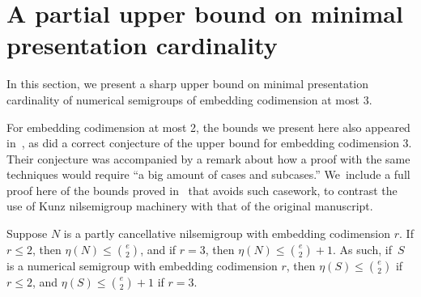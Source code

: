 \documentclass[ALCO]{cedram}
\begin{document}
\section{A partial upper bound on minimal presentation cardinality}
\label{sec:upperbound}



In this section, we present a sharp upper bound on minimal presentation cardinality of numerical semigroups of embedding codimension at most $3$.  

\begin{rema}\label{r:upperboundcite}
For embedding codimension at most 2, the bounds we present here also appeared in~\cite{highembdim}, as did a correct conjecture of the upper bound for embedding codimension 3.  Their conjecture was accompanied by a remark about how a proof with the same techniques would require ``a big amount of cases and subcases.''  
We~include a full proof here of the bounds proved in~\cite{highembdim} that avoids such casework, to contrast the use of Kunz nilsemigroup machinery with that of the original manuscript.  
\end{rema}

\begin{thm}\label{t:upperbound}
Suppose $N$ is a partly cancellative nilsemigroup with embedding codimension $r$.  If $r \le 2$, then $\eta(N) \le \binom{e}{2}$, and if $r = 3$, then $\eta(N) \le \binom{e}{2} + 1$.  As such, if~$S$ is a numerical semigroup with embedding codimension $r$, then $\eta(S) \le \binom{e}{2}$ if $r \le 2$, and $\eta(S) \le \binom{e}{2} + 1$ if $r = 3$.  
\end{thm}
\end{document}
